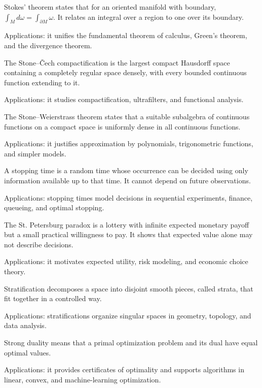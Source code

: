 Stokes' theorem states that for an oriented manifold with boundary, $\int_Md\omega=\int_{\partial M}\omega$. It relates an integral over a region to one over its boundary. \par\noindent Applications: it unifies the fundamental theorem of calculus, Green's theorem, and the divergence theorem.

The Stone--Čech compactification is the largest compact Hausdorff space containing a completely regular space densely, with every bounded continuous function extending to it. \par\noindent Applications: it studies compactification, ultrafilters, and functional analysis.

The Stone--Weierstrass theorem states that a suitable subalgebra of continuous functions on a compact space is uniformly dense in all continuous functions. \par\noindent Applications: it justifies approximation by polynomials, trigonometric functions, and simpler models.

A stopping time is a random time whose occurrence can be decided using only information available up to that time. It cannot depend on future observations. \par\noindent Applications: stopping times model decisions in sequential experiments, finance, queueing, and optimal stopping.

The St. Petersburg paradox is a lottery with infinite expected monetary payoff but a small practical willingness to pay. It shows that expected value alone may not describe decisions. \par\noindent Applications: it motivates expected utility, risk modeling, and economic choice theory.

Stratification decomposes a space into disjoint smooth pieces, called strata, that fit together in a controlled way. \par\noindent Applications: stratifications organize singular spaces in geometry, topology, and data analysis.

Strong duality means that a primal optimization problem and its dual have equal optimal values. \par\noindent Applications: it provides certificates of optimality and supports algorithms in linear, convex, and machine-learning optimization.

